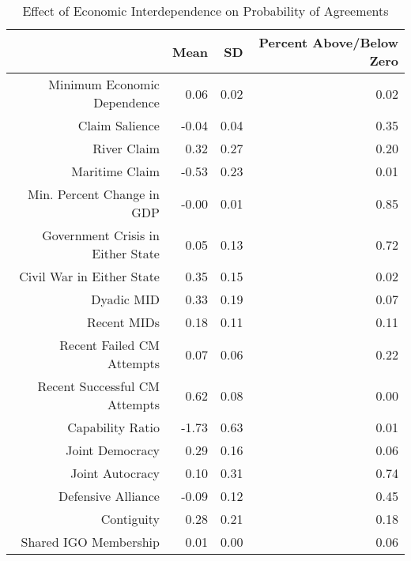 \begin{table}[ht]
	\caption{Effect of Economic Interdependence on Probability of Agreements}
	\label{tab: agreements}
	\centering
			\begin{tabular}{rrrr}
			\toprule
			& Mean & SD & Percent Above/Below Zero \\ 
			
			\midrule
			
			Minimum Economic Dependence & 0.06 & 0.02 & 0.02 \\ 
			
			Claim Salience & -0.04 & 0.04 & 0.35 \\ 
			
			River Claim & 0.32 & 0.27 & 0.20 \\ 
			
			Maritime Claim & -0.53 & 0.23 & 0.01 \\ 
			
			Min. Percent Change in GDP & -0.00 & 0.01 & 0.85 \\ 
			
			Government Crisis in Either State & 0.05 & 0.13 & 0.72 \\ 
			
			Civil War in Either State & 0.35 & 0.15 & 0.02 \\ 
			
			Dyadic MID & 0.33 & 0.19 & 0.07 \\ 
			
			Recent MIDs & 0.18 & 0.11 & 0.11 \\ 
			
			Recent Failed CM Attempts & 0.07 & 0.06 & 0.22 \\ 
			
			Recent Successful CM Attempts & 0.62 & 0.08 & 0.00 \\ 
			
			Capability Ratio & -1.73 & 0.63 & 0.01 \\ 
			
			Joint Democracy & 0.29 & 0.16 & 0.06 \\ 
			
			Joint Autocracy & 0.10 & 0.31 & 0.74 \\ 
			
			Defensive Alliance & -0.09 & 0.12 & 0.45 \\ 
			
			Contiguity & 0.28 & 0.21 & 0.18 \\ 
			
			Shared IGO Membership & 0.01 & 0.00 & 0.06 \\ 
			

\end{tabular}
\end{table}
